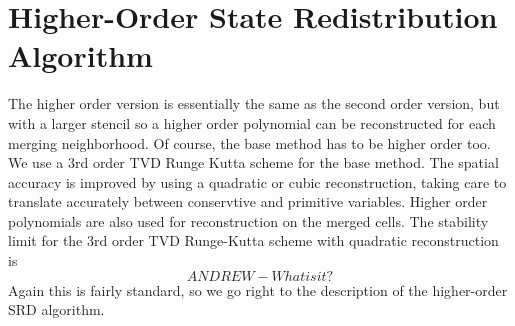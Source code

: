 \section{Higher-Order State Redistribution Algorithm}\label{sec:ho}

The higher order version is essentially the same as the second order
version, but with a larger stencil so a higher order polynomial can be
reconstructed for each merging neighborhood. Of course, the base method
has to be higher order too. We use a 3rd order TVD Runge Kutta scheme
for the base method.  The spatial accuracy is improved by using a
quadratic or cubic reconstruction, taking care to translate
accurately between conservtive and primitive variables.  Higher
order polynomials are also used for reconstruction on the merged cells. 
The stability limit for the 3rd order TVD Runge-Kutta scheme with
quadratic reconstruction is
\begin{equation}
ANDREW - What is it?
\end{equation}
Again this is fairly standard, so we go right
to the description of the higher-order SRD algorithm.

